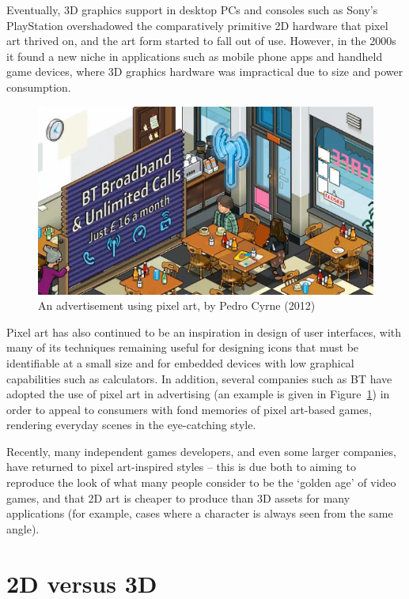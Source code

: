 \documentclass[12pt,twoside,notitlepage]{report}
\begin{document}
Eventually, 3D graphics support in desktop PCs and consoles such as Sony's PlayStation overshadowed the comparatively primitive 2D hardware that pixel art thrived on, and the art form started to fall out of use. However, in the 2000s it found a new niche in applications such as mobile phone apps and handheld game devices, where 3D graphics hardware was impractical due to size and power consumption.

\begin{figure}[h!]
\centering
\includegraphics{advert}
\caption{An advertisement using pixel art, by Pedro Cyrne (2012)}
\label{fig:advert}
\end{figure}

Pixel art has also continued to be an inspiration in design of user interfaces, with many of its techniques remaining useful for designing icons that must be identifiable at a small size and for embedded devices with low graphical capabilities such as calculators. In addition, several companies such as BT have adopted the use of pixel art in advertising (an example is given in Figure~\ref{fig:advert}) in order to appeal to consumers with fond memories of pixel art-based games, rendering everyday scenes in the eye-catching style.

Recently, many independent games developers, and even some larger companies, have returned to pixel art-inspired styles -- this is due both to aiming to reproduce the look of what many people consider to be the `golden age' of video games, and that 2D art is cheaper to produce than 3D assets for many applications (for example, cases where a character is always seen from the same angle).

\section{2D versus 3D}
\end{document}
